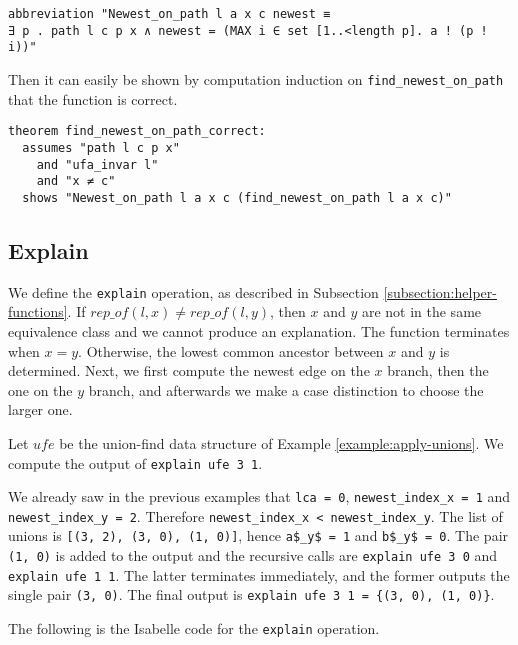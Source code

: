 \begin{lstlisting}
abbreviation "Newest_on_path l a x c newest ≡
∃ p . path l c p x ∧ newest = (MAX i ∈ set [1..<length p]. a ! (p ! i))"
\end{lstlisting}

Then it can easily be shown by computation induction on \lstinline{find_newest_on_path} that the function is correct.

\begin{lstlisting}
theorem find_newest_on_path_correct:
  assumes "path l c p x"
    and "ufa_invar l"
    and "x ≠ c"
  shows "Newest_on_path l a x c (find_newest_on_path l a x c)"
\end{lstlisting}

\subsection{Explain}

We define the \lstinline|explain| operation, as described in Subsection \ref{subsection:helper-functions}.
If $rep\_of(l, x) \neq rep\_of(l, y)$, then $x$ and $y$ are not in the same equivalence class and we cannot produce an explanation.
The function terminates when $x = y$.
Otherwise, the lowest common ancestor between $x$ and $y$ is determined.
Next, we first compute the newest edge on the $x$ branch, then the one on the $y$ branch, and afterwards we make a case distinction to choose the larger one.

\begin{exmp}
Let $ufe$ be the union-find data structure of Example \ref{example:apply-unions}. We compute the output of \lstinline|explain ufe 3 1|.

We already saw in the previous examples that \lstinline|lca = 0|, \lstinline|newest_index_x = 1| and \lstinline|newest_index_y = 2|.
Therefore \lstinline|newest_index_x < newest_index_y|.
The list of unions is \lstinline|[(3, 2), (3, 0), (1, 0)]|, hence \lstinline|a$_y$ = 1| and \lstinline|b$_y$ = 0|. The pair \lstinline|(1, 0)| is added to the output and the recursive calls are \lstinline|explain ufe 3 0| and \lstinline|explain ufe 1 1|. The latter terminates immediately, and the former outputs the single pair \lstinline|(3, 0)|. The final output is \lstinline|explain ufe 3 1 = {(3, 0), (1, 0)}|.
\end{exmp}

The following is the Isabelle code for the \lstinline|explain| operation.


